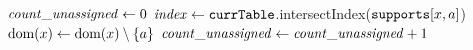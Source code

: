        \label{line:filterDom:0}
      \STATE $\mathit{count\_unassigned} \leftarrow 0$ \label{line:filterDom:1}
       \label{line:filterDom:2}
             \label{line:filterDom:3}
                  \STATE $\mathit{index} \leftarrow \texttt{currTable}$.intersectIndex($\texttt{supports}[x,a]$) \label{line:filterDom:4}
                   \label{line:filterDom:5}
                        \STATE {}  \label{line:filterDom:6}
                  \ELSE
                        \STATE $\text{dom}({x}) \leftarrow \text{dom}({x}) \setminus \left\{a\right\}$ \label{line:filterDom:7}
                         \label{line:filterDom:8}
                           \STATE $\mathit{count\_unassigned} \leftarrow \mathit{count\_unassigned} + 1$\label{line:filterDom:9}
                        \ENDIF
                  \ENDIF
             \ENDFOREACH
      \ENDFOREACH
       \label{line:filterDom:10}
         \label{line:filterDom:11}
      \ELSE
         \label{line:filterDom:12}
      \ENDIF
      \Endfunc
